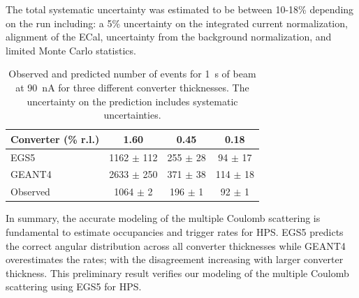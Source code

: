 The total systematic uncertainty was estimated to be between 10-18\% depending on the run including:  
a 5\% uncertainty on the integrated current normalization, 
alignment of the ECal, 
uncertainty from the background normalization, 
and limited Monte Carlo statistics.  
\begin{table}
\begin{tabular}{|l|c|c|c|}
\hline
Converter (\% r.l.) & 1.60 & 0.45 &	0.18 \\
\hline
EGS5 &	1162 $\pm$ 112 &	255 $\pm$ 28 &	94 $\pm$ 17	\\
\hline
GEANT4 & 2633 $\pm$ 250 & 	371 $\pm$ 38 &	114 $\pm$ 18 \\
\hline
Observed 	& 1064 $\pm$ 2 & 196 $\pm$ 1 &	92 $\pm$ 1 \\						
%						
\hline
\end{tabular}
\caption{ {\small Observed and predicted number of events for 1~s of beam at 90~nA for three different converter 
thicknesses. The uncertainty on the prediction includes systematic uncertainties. }}
\label{tab:ang_distr_dataMC}
\end{table}

In summary, the accurate modeling of the multiple Coulomb scattering is fundamental to estimate occupancies and trigger rates for HPS. EGS5 predicts the correct angular distribution across all converter thicknesses while GEANT4 overestimates the rates; with the disagreement increasing  with larger converter thickness. This preliminary result verifies our modeling of the multiple Coulomb scattering using EGS5 for HPS.
